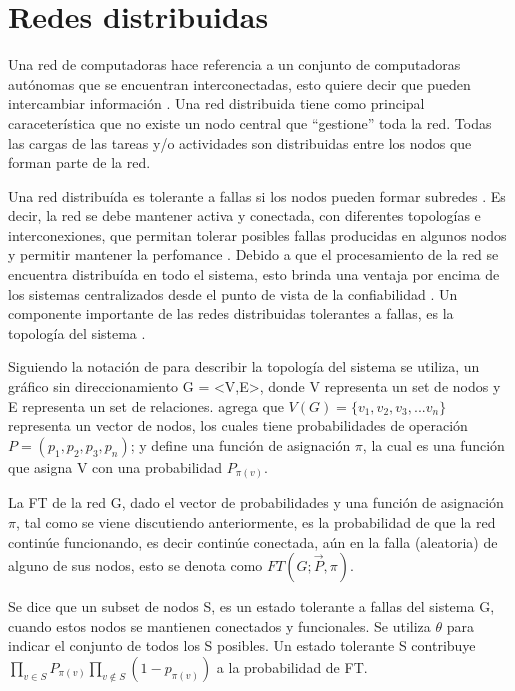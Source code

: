 \section{Redes distribuidas}\label{sec:redes_distribuidas}
Una red de computadoras hace referencia a un conjunto de computadoras autónomas que se encuentran interconectadas, esto quiere decir que pueden intercambiar información \citep{Tanenbaum12}. Una red distribuida tiene como principal caraceterística que no existe un nodo central que ``gestione'' toda la red. Todas las cargas de las tareas y/o actividades son distribuidas entre los nodos que forman parte de la red.

Una red distribuída es tolerante a fallas si los nodos pueden formar subredes \citep{Stivaros92}. Es decir, la red se debe mantener activa y conectada, con diferentes topologías e interconexiones, que permitan tolerar posibles fallas producidas en algunos nodos y permitir mantener la perfomance \citep{Stivaros92}. Debido a que el procesamiento de la red se encuentra distribuída en todo el sistema, esto brinda una ventaja por encima de los sistemas centralizados desde el punto de vista de la confiabilidad \citep{Pradhan82}. Un componente importante de las redes distribuidas tolerantes a fallas, es la topología del sistema \citep{Pradhan82}.

Siguiendo la notación de \cite{Pradhan82} para describir la topología del sistema se utiliza, un gráfico sin direccionamiento G = <V,E>, donde V representa un set de nodos y E representa un set de relaciones. \cite{Stivaros92} agrega que $V(G) = \{v_1,v_2,v_3, ... v_n \}$ representa un vector de nodos, los cuales tiene probabilidades de operación $P = (p_1, p_2, p_3, p_n)$; y define una función de asignación $\pi$, la cual es una función que asigna V con una probabilidad $P_{\pi(v)}$.

La \ac{FT} de la red G, dado el vector de probabilidades  y una función de asignación $\pi$, tal como se viene discutiendo anteriormente, es la probabilidad de que la red continúe funcionando, es decir continúe conectada, aún en la falla (aleatoria) de alguno de sus nodos, esto se denota  como $FT(G;\vec{P},\pi)$.

Se dice que un subset de nodos S, es un estado tolerante a fallas del sistema G, cuando estos nodos se mantienen conectados y funcionales. Se utiliza $\theta$ para indicar el conjunto de todos los S posibles. Un estado tolerante S contribuye $\prod_{v\in S}{P_{\pi (v)}} \prod_{v \notin S} (1-p_{\pi (v)})$ a la probabilidad de \ac{FT}.

